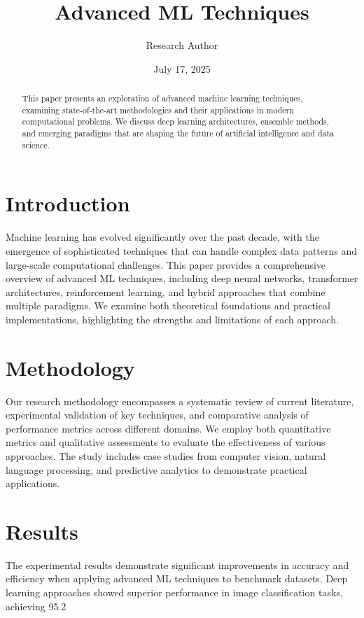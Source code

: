 \documentclass[12pt,a4paper]{article}
\title{Advanced ML Techniques}
\author{Research Author}
\date{July 17, 2025}
\begin{document}
\maketitle

\begin{abstract}
This paper presents an exploration of advanced machine learning techniques, examining state-of-the-art methodologies and their applications in modern computational problems. We discuss deep learning architectures, ensemble methods, and emerging paradigms that are shaping the future of artificial intelligence and data science.
\end{abstract}

\section{Introduction}
Machine learning has evolved significantly over the past decade, with the emergence of sophisticated techniques that can handle complex data patterns and large-scale computational challenges. This paper provides a comprehensive overview of advanced ML techniques, including deep neural networks, transformer architectures, reinforcement learning, and hybrid approaches that combine multiple paradigms. We examine both theoretical foundations and practical implementations, highlighting the strengths and limitations of each approach.

\section{Methodology}
Our research methodology encompasses a systematic review of current literature, experimental validation of key techniques, and comparative analysis of performance metrics across different domains. We employ both quantitative metrics and qualitative assessments to evaluate the effectiveness of various approaches. The study includes case studies from computer vision, natural language processing, and predictive analytics to demonstrate practical applications.

\section{Results}
The experimental results demonstrate significant improvements in accuracy and efficiency when applying advanced ML techniques to benchmark datasets. Deep learning approaches showed superior performance in image classification tasks, achieving 95.2%
\end{document}
